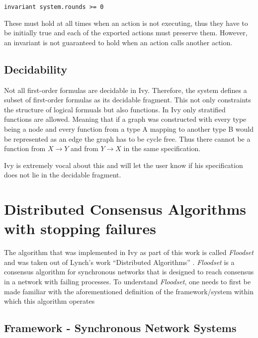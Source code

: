 \documentclass[fleqn]{article}
\begin{document}
\begin{mdframed}[backgroundcolor=light-gray, roundcorner=10pt,leftmargin=1, rightmargin=1, innerleftmargin=15, innertopmargin=15,innerbottommargin=15, outerlinewidth=1, linecolor=light-gray]
\begin{lstlisting}
invariant system.rounds >= 0
\end{lstlisting}
\end{mdframed}

These must hold at all times when an action is not executing, thus they have to be initially true and each of
the exported actions must preserve them. However, an invariant is not guaranteed to hold when an action calls another action.


\subsection{Decidability}
Not all first-order formulas are decidable in Ivy. Therefore, the system defines a subset of first-order formulas as its decidable fragment.
This not only constraints the structure of logical formuals but also functions. In Ivy only stratified functions are allowed. Meaning that if a graph was constructed
with every type being a node and every function from a type A mapping to another type B would be represented as an edge the graph has to be cycle free. Thus there cannot be a function from
$X \rightarrow Y$ and from $Y \rightarrow X$ in the same specification.

Ivy is extremely vocal about this and will let the user know if his specification does not lie in the decidable fragment.


\section{Distributed Consensus Algorithms with stopping failures}

The algorithm that was implemented in Ivy as part of this work is called \textit{Floodset} and was taken out of Lynch's work ``Distributed Algorithms'' \cite{refNancy}.
\textit{Floodset} is a consensus algorithm for synchronous networks that is designed to reach consensus in a network with failing processes.
To understand \textit{Floodset}, one needs to first be made familiar with the aforementioned definition of the framework/system within which this algorithm operates

\subsection{Framework - Synchronous Network Systems}
\end{document}
